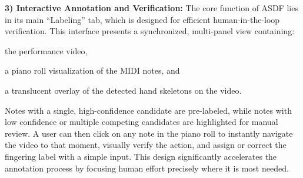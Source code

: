\documentclass{article}
\begin{document}
\textbf{3) Interactive Annotation and Verification:} The core function of ASDF lies in its main ``Labeling'' tab, which is designed for efficient human-in-the-loop verification. This interface presents a synchronized, multi-panel view containing: \begin{inparaenum}[(i)] \item the performance video, \item a piano roll visualization of the MIDI notes, and \item a translucent overlay of the detected hand skeletons on the video. \end{inparaenum} Notes with a single, high-confidence candidate are pre-labeled, while notes with low confidence or multiple competing candidates are highlighted for manual review. A user can then click on any note in the piano roll to instantly navigate the video to that moment, visually verify the action, and assign or correct the fingering label with a simple input. This design significantly accelerates the annotation process by focusing human effort precisely where it is most needed.

\end{document}
